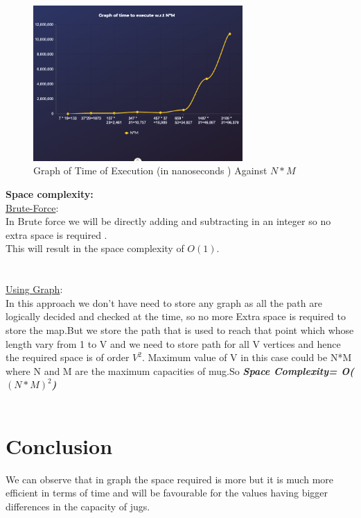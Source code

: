 \documentclass[conference]{IEEEtran}
\begin{document}
\begin{figure}[h]
\caption{Graph of Time of Execution (in nanoseconds ) Against $N*M$}
\centering
\includegraphics[width=8cm]{images/graphs.jpg}
\end{figure}


\textbf{Space complexity:}\\
\underline{Brute-Force}:\\
In Brute force we will be directly adding and subtracting in an integer so no extra space is required .\\
This will result in the space complexity of $O(1)$. 
\\\\\\
\underline{Using  Graph}:\\
In this  approach we don't have need to store any graph as all the path are logically decided and checked at the time, so no more Extra space is required to store the map.But we store the path that is used to reach that point which whose length vary from 1 to V and we need to store path for all V vertices and hence the required space is of order $V^{2}$.  Maximum value of V in this case could be N*M where N and M are the maximum capacities of mug.So \textit{\textbf{Space Complexity= O($(N*M)^{2}$)}}\\\\


\section{Conclusion}
We can observe that in graph the space required is more but it is much more efficient in terms of time and will be favourable for the values having bigger differences in the capacity of jugs.
\end{document}
